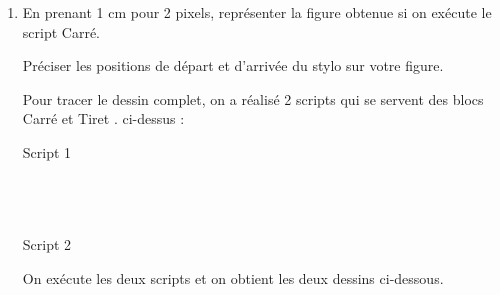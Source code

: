 \begin{enumerate}
\item En prenant 1 cm pour 2 pixels, représenter la figure obtenue si on exécute le script Carré.

Préciser les positions de départ et d'arrivée du stylo sur votre figure.

\medskip

Pour tracer le dessin complet, on a réalisé 2 scripts qui se servent des blocs \og  Carré\fg{} et \og Tiret \fg.
ci-dessus :

\begin{multicols}{2}
Script 1\\ \\ \\ \\

{\small \begin{scratch}
{
}
\end{scratch}}

Script 2\\
{\small \begin{scratch}
\end{scratch}}
\end{multicols}

\medskip
 
On exécute les deux scripts et on obtient les deux dessins ci-dessous.

\medskip


\end{enumerate}
